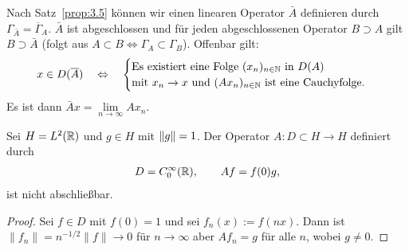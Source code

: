 \begin{bem*}
Nach Satz~\ref{prop:3.5} können wir einen linearen Operator
$\bar{A}$ definieren durch $\Gamma_{\bar{A}} = \overline{\Gamma}_A$.
$\bar{A}$ ist abgeschlossen und f\"ur jeden abgeschlossenen Operator
$B \supset A$ gilt $B \supset \bar{A}$
(folgt aus $A \subset B \Leftrightarrow \Gamma_A \subset \Gamma_B$).
Offenbar gilt:
\begin{align*}
x \in D(\overline{A})
\quad\Leftrightarrow\quad
\begin{cases}
\text{Es existiert eine Folge }(x_n)_{n \in \mathbb{N}} \text{ in } D(A)\\
\text{mit } x_n \to x \text{ und } (Ax_n)_{n \in \mathbb{N}}
\text{ ist eine Cauchyfolge.}
\end{cases}
\end{align*}
Es ist dann $\bar{A}x = \lim \limits_{n \to \infty} Ax_n$.\maphere
\end{bem*}
\begin{bsp*}
Sei $H = L^2(\mathbb{R})$ und $g\in H$ mit $\left\|g\right\|=1$. Der Operator $A
: D \subset H \to H$ definiert durch
\begin{align*}
  D = C_{0}^{\infty}(\mathbb{R}),\qquad Af = f(0)g,
\end{align*}
ist nicht abschließbar.
\begin{proof}
Sei $f\in D$ mit $f(0)=1$ und sei $f_n(x):=f(nx)$. Dann ist
$\|f_n\|=n^{-1/2}\|f\|\to 0$ f\"ur $n\to\infty$ aber
$Af_n = g$ f\"ur alle $n$, wobei $g\neq 0$.\qedhere\bsphere
\end{proof}
\end{bsp*}